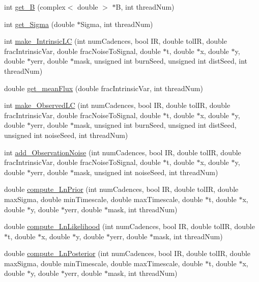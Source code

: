 \begin{DoxyCompactItemize}
\item 
int \hyperlink{class_task_a7b9ac1aba53d3c22158fe9f156fcaecd}{get\-\_\-\-B} (complex$<$ double $>$ $\ast$B, int thread\-Num)
\item 
int \hyperlink{class_task_a8fd8196de0aa7d4e48d23a6f665903f8}{get\-\_\-\-Sigma} (double $\ast$Sigma, int thread\-Num)
\item 
int \hyperlink{class_task_a10c759df8c4bae272f4212c1f0f79134}{make\-\_\-\-Intrinsic\-L\-C} (int num\-Cadences, bool I\-R, double tol\-I\-R, double frac\-Intrinsic\-Var, double frac\-Noise\-To\-Signal, double $\ast$t, double $\ast$x, double $\ast$y, double $\ast$yerr, double $\ast$mask, unsigned int burn\-Seed, unsigned int dist\-Seed, int thread\-Num)
\item 
double \hyperlink{class_task_add737444d615a0dbfee7505581de5561}{get\-\_\-mean\-Flux} (double frac\-Intrinsic\-Var, int thread\-Num)
\item 
int \hyperlink{class_task_ab885ea064a7974c4630a326f810700bd}{make\-\_\-\-Observed\-L\-C} (int num\-Cadences, bool I\-R, double tol\-I\-R, double frac\-Intrinsic\-Var, double frac\-Noise\-To\-Signal, double $\ast$t, double $\ast$x, double $\ast$y, double $\ast$yerr, double $\ast$mask, unsigned int burn\-Seed, unsigned int dist\-Seed, unsigned int noise\-Seed, int thread\-Num)
\item 
int \hyperlink{class_task_a80d246fe29fbecd58a3cbe687bbf50c1}{add\-\_\-\-Observation\-Noise} (int num\-Cadences, bool I\-R, double tol\-I\-R, double frac\-Intrinsic\-Var, double frac\-Noise\-To\-Signal, double $\ast$t, double $\ast$x, double $\ast$y, double $\ast$yerr, double $\ast$mask, unsigned int noise\-Seed, int thread\-Num)
\item 
double \hyperlink{class_task_aa7ba4cfa9ada40fd3e3399fce88fe6df}{compute\-\_\-\-Ln\-Prior} (int num\-Cadences, bool I\-R, double tol\-I\-R, double max\-Sigma, double min\-Timescale, double max\-Timescale, double $\ast$t, double $\ast$x, double $\ast$y, double $\ast$yerr, double $\ast$mask, int thread\-Num)
\item 
double \hyperlink{class_task_a370aa8207ebf85de80f5e0a4aa7a5fd8}{compute\-\_\-\-Ln\-Likelihood} (int num\-Cadences, bool I\-R, double tol\-I\-R, double $\ast$t, double $\ast$x, double $\ast$y, double $\ast$yerr, double $\ast$mask, int thread\-Num)
\item 
double \hyperlink{class_task_abd5c94a0e5d4d4e29bd81294d5bc0d30}{compute\-\_\-\-Ln\-Posterior} (int num\-Cadences, bool I\-R, double tol\-I\-R, double max\-Sigma, double min\-Timescale, double max\-Timescale, double $\ast$t, double $\ast$x, double $\ast$y, double $\ast$yerr, double $\ast$mask, int thread\-Num)

\end{DoxyCompactItemize}
